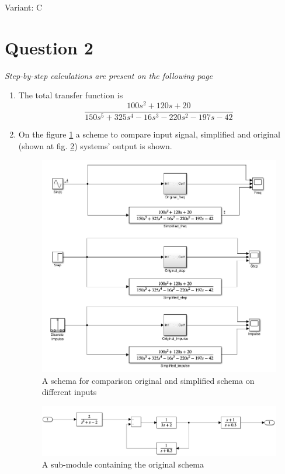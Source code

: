 \documentclass[12pt,letterpaper]{article}
\begin{document}
Variant: C
\section*{Question 2}
\label{Q:2}
\textit{Step-by-step calculations are present on the following page}
\begin{enumerate}[leftmargin=!,labelindent=5pt]
    \item 
    The total transfer function is
    \begin{equation*}
        \frac{100s^2+120s+20}{150s^5+325s^4-16s^3-220s^2-197s-42}
    \end{equation*}

    
    
    \item On the figure \ref{fig:all} a scheme to compare input signal, simplified and original (shown at fig. \ref{fig:original}) systems' output is shown. 
    
        \begin{figure}[H]
            \centering
            \includegraphics[width=15cm]{images/schemas/schemas.png}
            \caption{A schema for comparison original and simplified schema on different inputs}
            \label{fig:all}
        \end{figure}
    
    \begin{figure}[H]
            \centering
            \includegraphics[width=15cm]{images/schemas/ex2_original.png}
            \caption{A sub-module containing the original schema}
            \label{fig:original}
        \end{figure}
    

\end{enumerate}
\end{document}
